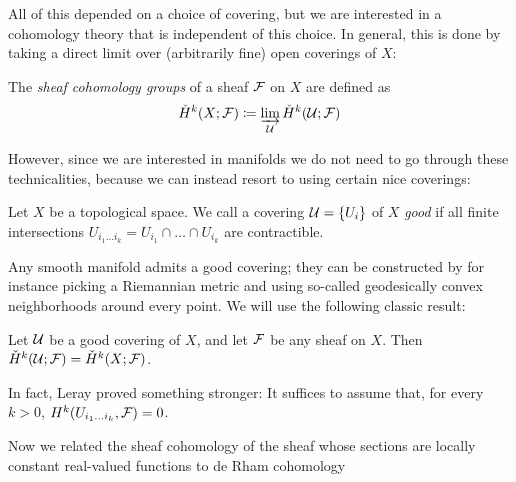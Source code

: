 \documentclass[parskip=half]{scrartcl}
\begin{document}
All of this depended on a choice of covering, but we are interested in a cohomology theory that is independent of this choice. In general, this is done by taking a direct limit over (arbitrarily fine) open coverings of $X$:

\begin{mydef}
	The \emph{sheaf cohomology groups} of a sheaf $\mathcal{F}$ on $X$ are defined as
	\begin{equation*}
		\check H^k(X;\mathcal{F})\coloneqq \varinjlim_{\mathcal{U}} \check H^k(\mathcal{U};\mathcal{F})
	\end{equation*}
\end{mydef}

However, since we are interested in manifolds we do not need to go through these technicalities, because we can instead resort to using certain nice coverings:

\begin{mydef}
	Let $X$ be a topological space. We call a covering $\mathcal{U}=\{U_i\}$ of $X$ \emph{good} if all finite intersections $U_{i_1\dots i_k}=U_{i_1}\cap\dots\cap U_{i_k}$ are contractible.
\end{mydef}

Any smooth manifold admits a good covering; they can be constructed by for instance picking a Riemannian metric and using so-called geodesically convex neighborhoods around every point. We will use the following classic result:

\begin{thm}[Leray]
	Let $\mathcal{U}$ be a good covering of $X$, and let $\mathcal{F}$ be any sheaf on $X$. Then $\check H^k(\mathcal{U};\mathcal{F})=\check H^k(X;\mathcal{F})$.
\end{thm}

\begin{rem}
	In fact, Leray proved something stronger: It suffices to assume that, for every $k>0$, $H^k(U_{i_1\dots i_k},\mathcal{F})=0$.
\end{rem}

Now we related the sheaf cohomology of the sheaf whose sections are locally constant real-valued functions to de Rham cohomology
\end{document}
